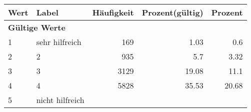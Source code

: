      \begin{longtable}{lXrrr}
     \toprule
     \textbf{Wert} & \textbf{Label} & \textbf{Häufigkeit} & \textbf{Prozent(gültig)} & \textbf{Prozent} \\
     \endhead
     \midrule
     \multicolumn{5}{l}{\textbf{Gültige Werte}}\\

     1 &
     \multicolumn{1}{X}{ sehr hilfreich   } &


       \num{169} &
       \num[round-mode=places,round-precision=2]{1.03} &
         \num[round-mode=places,round-precision=2]{0.6} \\

     2 &
     \multicolumn{1}{X}{ 2   } &


       \num{935} &
       \num[round-mode=places,round-precision=2]{5.7} &
         \num[round-mode=places,round-precision=2]{3.32} \\

     3 &
     \multicolumn{1}{X}{ 3   } &


       \num{3129} &
       \num[round-mode=places,round-precision=2]{19.08} &
         \num[round-mode=places,round-precision=2]{11.1} \\

     4 &
     \multicolumn{1}{X}{ 4   } &


       \num{5828} &
       \num[round-mode=places,round-precision=2]{35.53} &
         \num[round-mode=places,round-precision=2]{20.68} \\

     5 &
     \multicolumn{1}{X}{ nicht hilfreich   } &



\end{longtable}
